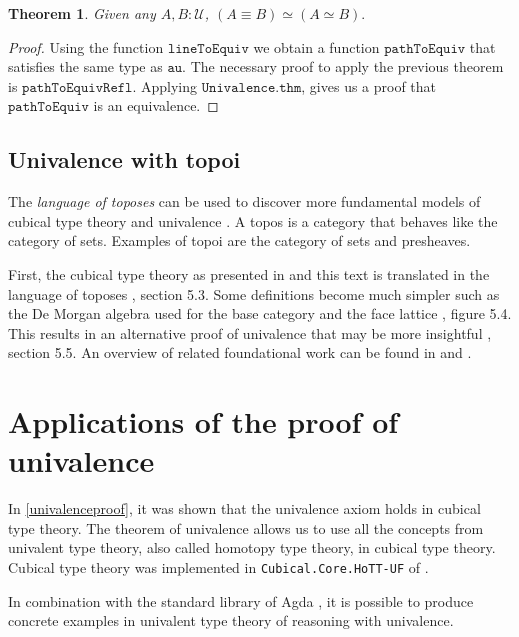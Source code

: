 \documentclass[12pt,a4paper,twoside,xetex,draft]{book}
\newcommand{\keyword}[1]{\emph{#1}\index{#1}}
\newtheorem{theorem}{Theorem}[section]
\newcommand{\op}[1]{\mathtt{#1}}
\begin{document}
\begin{theorem}
Given any $A,B : \mathcal{U}$, $\left( A \equiv B \right) \simeq \left( A \simeq B \right).$
\end{theorem}


\begin{proof}
Using the function $\op{lineToEquiv}$ we obtain a function $\op{pathToEquiv}$ that satisfies the same type as $\op{au}$. The necessary proof to apply the previous theorem is $\op{pathToEquivRefl}$. Applying $\op{Univalence.thm}$, gives us a proof that $\op{pathToEquiv}$ is an equivalence.
\end{proof}

\subsection{Univalence with topoi}

The \keyword{language of toposes} can be used to discover more fundamental models of cubical type theory and univalence \cite{Orton2019}. A topos is a category that behaves like the category of sets. Examples of topoi are the category of sets and presheaves. 

First, the cubical type theory as presented in \cite{Huber2016} and this text is translated in the  language of toposes \cite{Orton2019}, section 5.3. Some definitions become much simpler such as the De Morgan algebra used for the base category and the face lattice \cite{Orton2019}, figure 5.4. This results in an alternative proof of univalence that may be more insightful \cite{Orton2019}, section 5.5. An overview of related foundational work can be found in \cite{Pitts2018} and \cite{Licata2018}.


\section{Applications of the proof of univalence} \label{applications}

In \cref{univalenceproof}, it was shown that the univalence axiom holds in cubical type theory. The theorem of univalence allows us to use all the concepts from univalent type theory, also called homotopy type theory, in cubical type theory. Cubical type theory was implemented in \texttt{Cubical.Core.HoTT-UF} of \cite{Moertberg2018}.

In combination with the standard library of Agda \cite{Danielsson2019}, it is possible to produce concrete examples in univalent type theory of reasoning with univalence.
\end{document}
